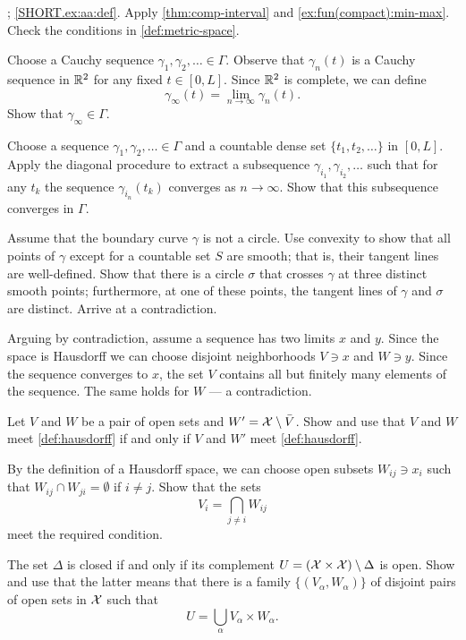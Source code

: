 \parbf{\ref{ex:aa}}; \ref{SHORT.ex:aa:def}.
Apply \ref{thm:comp-interval} and \ref{ex:fun(compact):min-max}. Check the conditions in \ref{def:metric-space}.

 Choose a Cauchy sequence $\gamma_1,\gamma_2,\ldots\in\Gamma$.
Observe that $\gamma_n(t)$ is a Cauchy sequence in $\mathbb{R}^2$ for any fixed $t\in [0,L]$.
Since $\mathbb{R}^2$ is complete, we can define
\[\gamma_\infty(t)=\lim_{n\to\infty}\gamma_n(t).\]
Show that $\gamma_\infty\in\Gamma$.

 Choose a sequence $\gamma_1,\gamma_2,\ldots\in\Gamma$ and a countable dense set $\{t_1,t_2,\ldots\}$ in $[0,L]$.
Apply the diagonal procedure to extract a subsequence $\gamma_{i_1}, \gamma_{i_2},\ldots$ such that for any $t_k$ the sequence $\gamma_{i_n}(t_k)$ converges as $n\to\infty$.
Show that this subsequence converges in $\Gamma$.

Assume that the boundary curve $\gamma$ is not a circle.
Use convexity to show that all points of $\gamma$ except for a countable set $S$ are smooth; that is, their tangent lines are well-defined.
Show that there is a circle $\sigma$ that crosses $\gamma$ at three distinct smooth points; furthermore, at one of these points, the tangent lines of $\gamma$ and $\sigma$ are distinct.
Arrive at a contradiction.


 Arguing by contradiction, assume a sequence has two limits $x$ and $y$.
Since the space is Hausdorff we can choose disjoint neighborhoods $V\ni x$ and $W\ni y$.
Since the sequence converges to $x$, the set $V$ contains all but finitely many elements of the sequence.
The same holds for $W$ --- a contradiction.

Let $V$ and $W$ be a pair of open sets and $W'=\mathcal{X}\setminus \bar V$.
Show and use that $V$ and $W$ meet \ref{def:hausdorff} if and only if $V$ and $W'$ meet \ref{def:hausdorff}.

By the definition of a Hausdorff space, we can choose open subsets $W_{ij}\ni x_i$ such that $W_{ij}\cap W_{ji}=\emptyset$ if $i\ne j$.
Show that the sets
\[V_i=\bigcap_{j\ne i}W_{ij}\]
meet the required condition.

The set $\Delta$ is closed if and only if its complement $U=(\mathcal{X}\times\mathcal{X})\setminus\Delta$ is open.
Show and use that the latter means that there is a family $\{(V_\alpha,W_\alpha)\}$ of disjoint pairs of open sets in $\mathcal{X}$ such that
\[U=\bigcup_\alpha V_\alpha\times W_\alpha.\]

